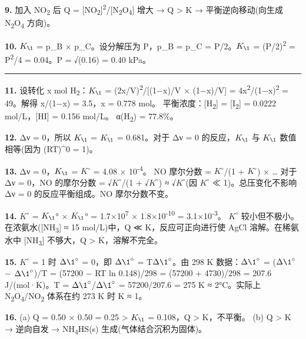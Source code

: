 \documentclass[a4paper,11pt]{ctexart}
\begin{document}
\textbf{9.} 加入 NO\textsubscript{2} 后 Q = {[}NO\textsubscript{2}{]}\textsuperscript{2}/{[}N\textsubscript{2}O\textsubscript{4}{]} 增大 → Q \textgreater{} K → 平衡逆向移动(向生成 N\textsubscript{2}O\textsubscript{4} 方向)。

\textbf{10.} \(K_{\1}\) = p\_B × p\_C。设分解压为 P，p\_B = p\_C = P/2。\(K_{\1}\) = (P/2)\textsuperscript{2} = P\textsuperscript{2}/4 = 0.04。P = √(0.16) = 0.40 kPa。

\begin{center}\rule{0.5\linewidth}{0.5pt}\end{center}

\textbf{11.} 设转化 x mol H\textsubscript{2}：\(K_{\1}\) = (2x/V)\textsuperscript{2}/{[}(1−x)/V × (1−x)/V{]} = 4x\textsuperscript{2}/(1−x)\textsuperscript{2} = 49。解得 x/(1−x) = 3.5，x = 0.778 mol。
平衡浓度：{[}H\textsubscript{2}{]} = {[}I\textsubscript{2}{]} = 0.0222 mol/L，{[}HI{]} = 0.156 mol/L。
α(H\textsubscript{2}) = 77.8\%。

\textbf{12.} Δν = 0，所以 \(K_{\1}\) = \(K_{\1}\) = 0.681。对于 Δν = 0 的反应，\(K_{\1}\) 与 \(K_{\1}\) 数值相等(因为 (RT)\^{}0 = 1)。

\textbf{13.} Δν = 0，\(K_{\1}\) = \(K^{\circ}\) = 4.08 × 10\textsuperscript{-4}。
NO 摩尔分数 = \(K^{\circ}\)/(1 + \(K^{\circ}\)) × \ldots{} 对于 Δν = 0，NO 的摩尔分数 = √\(K^{\circ}\)/(1 + √\(K^{\circ}\)) ≈ √\(K^{\circ}\)(因 \(K^{\circ}\) ≪ 1)。总压变化不影响 Δν = 0 的反应平衡组成。NO 摩尔分数不变。

\textbf{14.} \(K^{\circ}\) = \(K_{\1}\)° × \(K_{\1}\)° = 1.7×10\textsuperscript{7} × 1.8×10\textsuperscript{-10} = 3.1×10\textsuperscript{-3}。
\(K^{\circ}\) 较小但不极小。在浓氨水({[}NH\textsubscript{3}{]} ≈ 15 mol/L)中，Q ≪ K，反应可正向进行使 AgCl 溶解。在稀氨水中 {[}NH\textsubscript{3}{]} 不够大，Q \textgreater{} K，溶解不完全。

\textbf{15.} \(K^{\circ}\) = 1 时 \(\Delta \1^{\circ}\) = 0，即 \(\Delta \1^{\circ}\) = T\(\Delta \1^{\circ}\)。由 298 K 数据：\(\Delta \1^{\circ}\) = (\(\Delta \1^{\circ}\) − \(\Delta \1^{\circ}\))/T = (57200 − RT ln 0.148)/298 = (57200 + 4730)/298 = 207.6 J/(mol·K)。T = \(\Delta \1^{\circ}\)/\(\Delta \1^{\circ}\) = 57200/207.6 = 275 K ≈ 2°C。实际上 N\textsubscript{2}O\textsubscript{4}/NO\textsubscript{2} 体系在约 273 K 时 K ≈ 1。

\textbf{16.}
(a) Q = 0.50 × 0.50 = 0.25 \textgreater{} \(K_{\1}\) = 0.108，Q \textgreater{} K，不平衡。
(b) Q \textgreater{} K → 逆向自发 → NH\textsubscript{4}HS(s) 生成(气体结合沉积为固体)。
\end{document}
